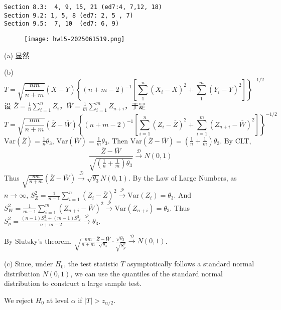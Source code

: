 \begin{lstlisting}
Section 8.3:  4, 9, 15, 21 (ed7:4, 7,12, 18)
Section 9.2: 1, 5, 8 (ed7: 2, 5 , 7)  
Section 9.5:  7, 10  (ed7: 6, 9)
\end{lstlisting}
\begin{exercise}
\begin{figure}[H]
\centering
\texttt{[image: hw15-2025061519.png]}
\label{}
\end{figure}
\end{exercise}
(a) 显然

(b)
\[
T=\sqrt{\frac{n m}{n+m}}(\bar{X}-\bar{Y})\left\{(n+m-2)^{-1}\left[\sum_1^n\left(X_i-\bar{X}\right)^2+\sum_1^m\left(Y_i-\bar{Y}\right)^2\right]\right\}^{-1 / 2}
\]
设 $\overline{Z}=\frac{1}{n}\sum_{i=1}^{n}Z_i$，$\overline{W}=\frac{1}{m}\sum_{i=1}^{m}Z_{n+i}$，于是
\[
T=\sqrt{ \frac{nm}{n+m} }(\overline{Z}-\overline{W})\left\{  (n+m-2)^{-1}\left[ \sum_{i=1}^{n} (Z_i-\overline{Z})^{2}+\sum_{i=1}^{m} (Z_{n+i}-\overline{W})^{2} \right]  \right\}^{-1/2 }
\]
$\mathrm{Var}(\overline{Z})=\frac{1}{n}\theta_3$, $\mathrm{Var}(\overline{W})=\frac{1}{m}\theta_3$. Then $\mathrm{Var}(\overline{Z}-\overline{W})=\left( \frac{1}{n}+\frac{1}{m} \right)\theta_3$. By CLT,
\[
\frac{\overline{Z}-\overline{W}}{\sqrt{ \left( \frac{1}{n}+\frac{1}{m}  \right)\theta_3}}\overset{ \mathcal{D} }{ \to }N(0,1)
\]
Thus $\sqrt{ \frac{nm}{n+m} }(\overline{Z}-\overline{W})\overset{ \mathcal{D} }{ \to }\sqrt{ \theta_3 }N(0,1)$. By the Law of Large Numbers, as $n\to \infty$, $S_{Z}^{2}=\frac{1}{n-1}\sum_{i=1}^{n}(Z_i-\overline{Z})^{2}\overset{ \mathcal{P} }{ \to }\mathrm{Var}(Z_i)=\theta_3$. And $S_{W}^{2}=\frac{1}{m-1}\sum_{i=1}^{m}(Z_{n+i}-\overline{W})^{2}\overset{ \mathcal{P} }{ \to }\mathrm{Var}(Z_{n+i})=\theta_3$. Thus $S_{p}^{2}=\frac{(n-1)S_{Z}^{2}+(m-1)S_{W}^{2}}{n+m-2}\overset{ \mathcal{P} }{ \to }\theta_3$.

By Slutsky's theorem, $\sqrt{ \frac{nm}{n+m} }\frac{\overline{Z}-\overline{W}}{\sqrt{ \theta_3 }}\cdot\frac{\sqrt{ \theta_3 }}{\sqrt{ S_{p}^{2} }}\overset{ \mathcal{D} }{ \to }N(0,1)$.

(c)
Since, under $H_0$, the test statistic $T$ asymptotically follows a standard normal distribution $N(0,1)$, we can use the quantiles of the standard normal distribution to construct a large sample test.

We reject $H_0$ at level $\alpha$ if $\lvert T \rvert>z_{\alpha/2 }$.


